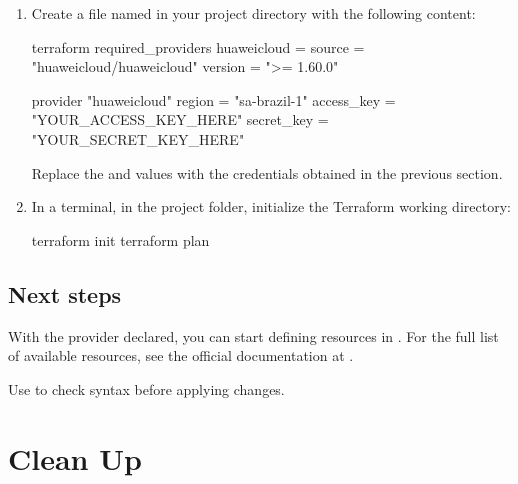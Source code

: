 \documentclass{guide}
\begin{document}
\stepbystep
\begin{enumerate}
  \item Create a file named  in your project directory
        with the following content:

  \begin{code}
terraform {
  required_providers {
    huaweicloud = {
      source  = "huaweicloud/huaweicloud"
      version = ">= 1.60.0"
    }
  }
}

provider "huaweicloud" {
  region     = "sa-brazil-1"
  access_key = "YOUR_ACCESS_KEY_HERE"
  secret_key = "YOUR_SECRET_KEY_HERE"
}
  \end{code}

  Replace the  and  values with the
  credentials obtained in the previous section.

  \item In a terminal, in the project folder, initialize the Terraform
        working directory:

  \begin{code}[bash]
terraform init
terraform plan
  \end{code}

\end{enumerate}

\subsection{Next steps}

With the provider declared, you can start defining resources in
. For the full list of available resources, see the official
documentation at
.

\begin{tip}
Use  to check syntax before applying changes.
\end{tip}


\section{Clean Up}
\end{document}
